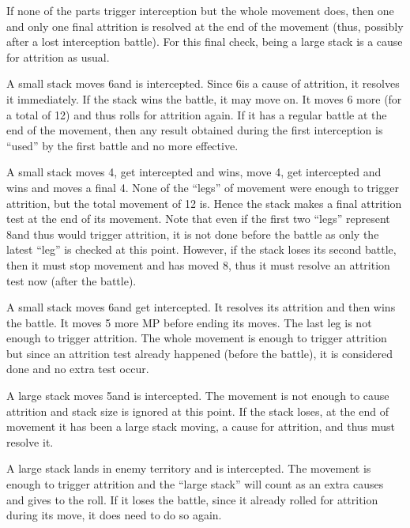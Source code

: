 If none of the parts trigger interception but the whole movement does, then
one and only one final attrition is resolved at the end of the movement (thus,
possibly after a lost interception battle). For this final check, being a
large stack is a cause for attrition as usual.

\begin{exemple}
  A small stack moves 6\MP and is intercepted. Since 6\MP is a cause of
  attrition, it resolves it immediately. If the stack wins the battle, it may
  move on. It moves 6 more \MP (for a total of 12) and thus rolls for
  attrition again. If it has a regular battle at the end of the movement, then
  any  result obtained during the first interception is
  ``used'' by the first battle and no more effective.

  \smallskip

  A small stack moves 4\MP, get intercepted and wins, move 4\MP, get
  intercepted and wins and moves a final 4\MP. None of the ``legs'' of
  movement were enough to trigger attrition, but the total movement of 12\MP
  is. Hence the stack makes a final attrition test at the end of its
  movement. Note that even if the first two ``legs'' represent 8\MP and thus
  would trigger attrition, it is not done before the battle as only the latest
  ``leg'' is checked at this point. However, if the stack loses its second
  battle, then it must stop movement and has moved 8\MP, thus it must resolve
  an attrition test now (after the battle).

  \smallskip

  A small stack moves 6\MP and get intercepted. It resolves its attrition and
  then wins the battle. It moves 5 more MP before ending its moves. The last
  leg is not enough to trigger attrition. The whole movement is enough to
  trigger attrition but since an attrition test already happened (before the
  battle), it is considered done and no extra test occur.

  \smallskip

  A large stack moves 5\MP and is intercepted. The movement is not enough to
  cause attrition and stack size is ignored at this point. If the stack loses,
  at the end of movement it has been a large stack moving, a cause for
  attrition, and thus must resolve it.

  A large stack lands in enemy territory and is intercepted. The movement is
  enough to trigger attrition and the ``large stack'' will count as an extra
  causes and gives  to the roll. If it loses the battle, since it
  already rolled for attrition during its move, it does need to do so again.
\end{exemple}

